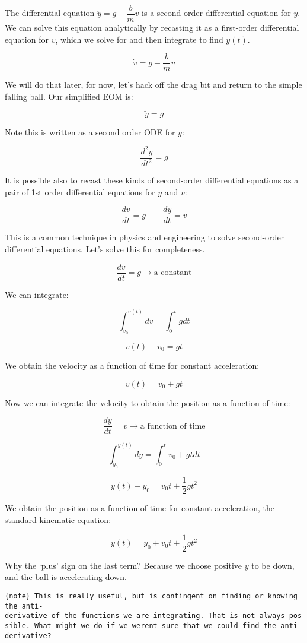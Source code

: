 \documentclass[11pt]{article}
\begin{document}
The differential equation \(\ddot{y} = g - \dfrac{b}{m}v\) is a
second-order differential equation for \(y\). We can solve this equation
analytically by recasting it as a first-order differential equation for
\(v\), which we solve for and then integrate to find \(y(t)\).

\[\dot{v} = g - \dfrac{b}{m}v\]

We will do that later, for now, let's hack off the drag bit and return
to the simple falling ball. Our simplified EOM is:

\[\ddot{y} = g\]

Note this is written as a second order ODE for \(y\):

\[\dfrac{d^2y}{dt^2} = g\]

It is possible also to recast these kinds of second-order differential
equations as a pair of 1st order differential equations for \(y\) and
\(v\):

\[\dfrac{dv}{dt} = g \qquad \dfrac{dy}{dt} = v\]

This is a common technique in physics and engineering to solve
second-order differential equations. Let's solve this for completeness.

\[\dfrac{dv}{dt} = g \longrightarrow \textrm{a constant}\]

We can integrate:

\[\int_{v_0}^{v(t)} dv = \int_{0}^{t} g dt\]

\[v(t) - v_0 = gt\]

We obtain the velocity as a function of time for constant acceleration:

\[v(t) = v_0 + gt\]

Now we can integrate the velocity to obtain the position as a function
of time:

\[\dfrac{dy}{dt} = v \longrightarrow \textrm{a function of time}\]

\[\int_{y_0}^{y(t)} dy = \int_{0}^{t} v_0 + gt dt\]

\[y(t) - y_0 = v_0 t + \dfrac{1}{2}gt^2\]

We obtain the position as a function of time for constant acceleration,
the standard kinematic equation:

\[y(t) = y_0 + v_0 t + \dfrac{1}{2}gt^2\]

Why the `plus' sign on the last term? Because we choose positive \(y\)
to be down, and the ball is accelerating down.

\texttt{\{note\}\ This\ is\ really\ useful,\ but\ is\ contingent\ on\ finding\ or\ knowing\ the\ anti-derivative\ of\ the\ functions\ we\ are\ integrating.\ That\ is\ not\ always\ possible.\ What\ might\ we\ do\ if\ we\ weren\textquotesingle{}t\ sure\ that\ we\ could\ find\ the\ anti-derivative?}
\end{document}
